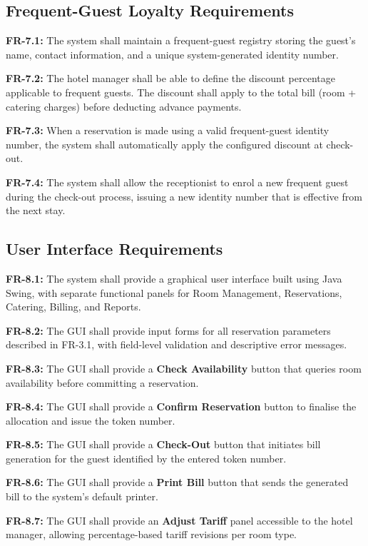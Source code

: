\documentclass[12pt,a4paper]{article}
\newcommand{\req}[2]{%
  \noindent\textbf{\color{medblue}#1:} #2\par\smallskip
}
\begin{document}
\subsection{Frequent-Guest Loyalty Requirements}

\req{FR-7.1}{The system shall maintain a frequent-guest registry storing the guest's name,
contact information, and a unique system-generated identity number.}

\req{FR-7.2}{The hotel manager shall be able to define the discount percentage applicable
to frequent guests. The discount shall apply to the total bill (room + catering charges)
before deducting advance payments.}

\req{FR-7.3}{When a reservation is made using a valid frequent-guest identity number, the
system shall automatically apply the configured discount at check-out.}

\req{FR-7.4}{The system shall allow the receptionist to enrol a new frequent guest during
the check-out process, issuing a new identity number that is effective from the next stay.}

\subsection{User Interface Requirements}

\req{FR-8.1}{The system shall provide a graphical user interface built using Java Swing,
with separate functional panels for Room Management, Reservations, Catering, Billing,
and Reports.}

\req{FR-8.2}{The GUI shall provide input forms for all reservation parameters described
in FR-3.1, with field-level validation and descriptive error messages.}

\req{FR-8.3}{The GUI shall provide a \textbf{Check Availability} button that queries room
availability before committing a reservation.}

\req{FR-8.4}{The GUI shall provide a \textbf{Confirm Reservation} button to finalise the
allocation and issue the token number.}

\req{FR-8.5}{The GUI shall provide a \textbf{Check-Out} button that initiates bill
generation for the guest identified by the entered token number.}

\req{FR-8.6}{The GUI shall provide a \textbf{Print Bill} button that sends the generated
bill to the system's default printer.}

\req{FR-8.7}{The GUI shall provide an \textbf{Adjust Tariff} panel accessible to the hotel
manager, allowing percentage-based tariff revisions per room type.}
\end{document}
